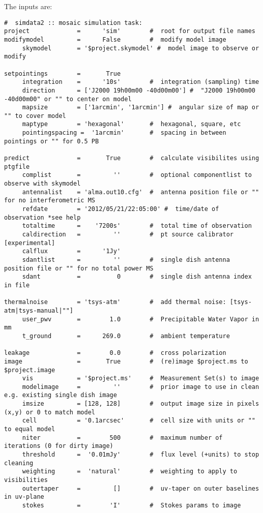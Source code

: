 The inputs are:
\small
\begin{verbatim}
#  simdata2 :: mosaic simulation task:
project             =      'sim'        #  root for output file names
modifymodel         =      False        #  modify model image
     skymodel       = '$project.skymodel' #  model image to observe or modify

setpointings        =       True        
     integration    =      '10s'        #  integration (sampling) time
     direction      = ['J2000 19h00m00 -40d00m00'] #  "J2000 19h00m00 -40d00m00" or "" to center on model
     mapsize        = ['1arcmin', '1arcmin'] #  angular size of map or "" to cover model
     maptype        = 'hexagonal'       #  hexagonal, square, etc
     pointingspacing =  '1arcmin'       #  spacing in between pointings or "" for 0.5 PB

predict             =       True        #  calculate visibilites using ptgfile
     complist       =         ''        #  optional componentlist to observe with skymodel
     antennalist    = 'alma.out10.cfg'  #  antenna position file or "" for no interferometric MS
     refdate        = '2012/05/21/22:05:00' #  time/date of observation *see help
     totaltime      =    '7200s'        #  total time of observation
     caldirection   =         ''        #  pt source calibrator [experimental]
     calflux        =      '1Jy'        
     sdantlist      =         ''        #  single dish antenna position file or "" for no total power MS
     sdant          =          0        #  single dish antenna index in file

thermalnoise        = 'tsys-atm'        #  add thermal noise: [tsys-atm|tsys-manual|""]
     user_pwv       =        1.0        #  Precipitable Water Vapor in mm
     t_ground       =      269.0        #  ambient temperature

leakage             =        0.0        #  cross polarization
image               =       True        #  (re)image $project.ms to $project.image
     vis            = '$project.ms'     #  Measurement Set(s) to image
     modelimage     =         ''        #  prior image to use in clean e.g. existing single dish image
     imsize         = [128, 128]        #  output image size in pixels (x,y) or 0 to match model
     cell           = '0.1arcsec'       #  cell size with units or "" to equal model
     niter          =        500        #  maximum number of iterations (0 for dirty image)
     threshold      =  '0.01mJy'        #  flux level (+units) to stop cleaning
     weighting      =  'natural'        #  weighting to apply to visibilities
     outertaper     =         []        #  uv-taper on outer baselines in uv-plane
     stokes         =        'I'        #  Stokes params to image


\end{verbatim}
